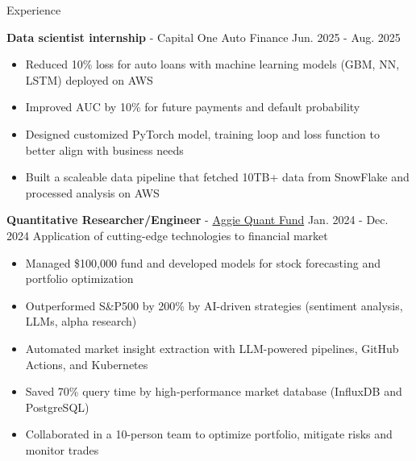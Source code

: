 \documentclass{resume}
\begin{document}
\begin{rSection}{Experience}
    \vspace{-1em}
    \item \textbf{Data scientist internship} - Capital One Auto Finance \hfill Jun. 2025 - Aug. 2025
        \begin{itemize}
        \item Reduced 10\% loss for auto loans with machine learning models (GBM, NN, LSTM) deployed on AWS
        \item Improved AUC by 10\% for future payments and default probability
        \item Designed customized PyTorch model, training loop and loss function to better align with business needs
        \item Built a scaleable data pipeline that fetched 10TB+ data from SnowFlake and processed analysis on AWS
        \end{itemize}

    \item \textbf{Quantitative Researcher/Engineer} - \href{https://www.linkedin.com/company/aggieqf}{Aggie Quant Fund} \hfill Jan. 2024 - Dec. 2024
        \newline\hspace*{0.5em} {\normalsize Application of cutting-edge technologies to financial market}
        \begin{itemize}
        \item Managed \$100,000 fund and developed models for stock forecasting and portfolio optimization
        \item Outperformed S\&P500 by 200\% by AI-driven strategies (sentiment analysis, LLMs, alpha research)
        \item Automated market insight extraction with LLM-powered pipelines, GitHub Actions, and Kubernetes
        \item Saved 70\% query time by high-performance market database (InfluxDB and PostgreSQL)
        \item Collaborated in a 10-person team to optimize portfolio, mitigate risks and monitor trades
        \end{itemize}


\end{rSection}
\end{document}
